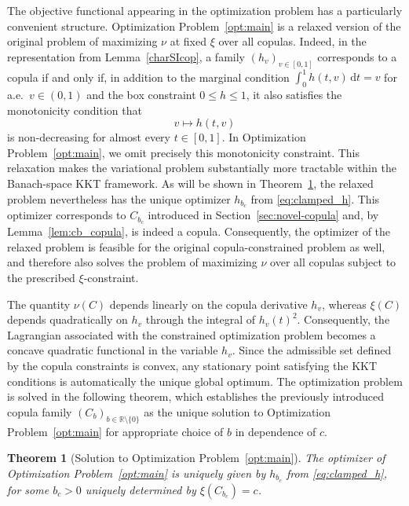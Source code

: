\documentclass{article}
\newtheorem{theorem}{Theorem}[section]
\DeclareMathOperator{\clamp}{clamp}
\newcommand{\1}{\mathds{1}}
\newcommand{\de}{\mathrm{\,d}}
\newcommand{\R}{\mathbb{R}}
\begin{document}
The objective functional appearing in the optimization problem has a particularly convenient structure.
Optimization Problem~\ref{opt:main} is a relaxed version of the original problem of maximizing $\nu$ at fixed $\xi$ over all copulas. 
Indeed, in the representation from Lemma~\ref{charSIcop}, a family $(h_v)_{v\in[0,1]}$ corresponds to a copula if and only if, in addition to the marginal condition
\(
\int_0^1 h(t,v)\de t = v
\)
for a.e.~$v\in(0,1)$ and the box constraint \(0\le h\le 1\), it also satisfies the monotonicity condition that
\[
v\mapsto h(t,v)
\]
is non-decreasing for almost every \(t\in[0,1]\). 
In Optimization Problem~\ref{opt:main}, we omit precisely this monotonicity constraint. 
This relaxation makes the variational problem substantially more tractable within the Banach-space KKT framework. 
As will be shown in Theorem~\ref{thm:KKT}, the relaxed problem nevertheless has the unique optimizer \(h_{b_c}\) from \eqref{eq:clamped_h}. 
This optimizer corresponds to \(C_{b_c}\) introduced in Section~\ref{sec:novel-copula} and, by Lemma~\ref{lem:cb_copula}, is indeed a copula.
Consequently, the optimizer of the relaxed problem is feasible for the original copula-constrained problem as well, and therefore also solves the problem of maximizing \(\nu\) over all copulas subject to the prescribed \(\xi\)-constraint.

The quantity $\nu(C)$ depends linearly on the copula derivative $h_v$, whereas $\xi(C)$ depends quadratically on $h_v$ through the integral of $h_v(t)^2$.
Consequently, the Lagrangian associated with the constrained optimization problem becomes a concave quadratic functional in the variable $h_v$.
Since the admissible set defined by the copula constraints is convex, any stationary point satisfying the KKT conditions is automatically the unique global optimum.
The optimization problem is solved in the following theorem, which establishes the previously introduced copula family $(C_b)_{b\in\R\setminus\{0\}}$ as the unique solution to Optimization Problem~\ref{opt:main} for appropriate choice of $b$ in dependence of $c$.

\begin{theorem}[Solution to Optimization Problem~\ref{opt:main}]\label{thm:KKT}
The optimizer of Optimization Problem~\ref{opt:main} is uniquely given by $h_{b_c}$ from \eqref{eq:clamped_h}, for some $b_c>0$ uniquely determined by $\xi(C_{b_c})=c$.
\end{theorem}
\end{document}
